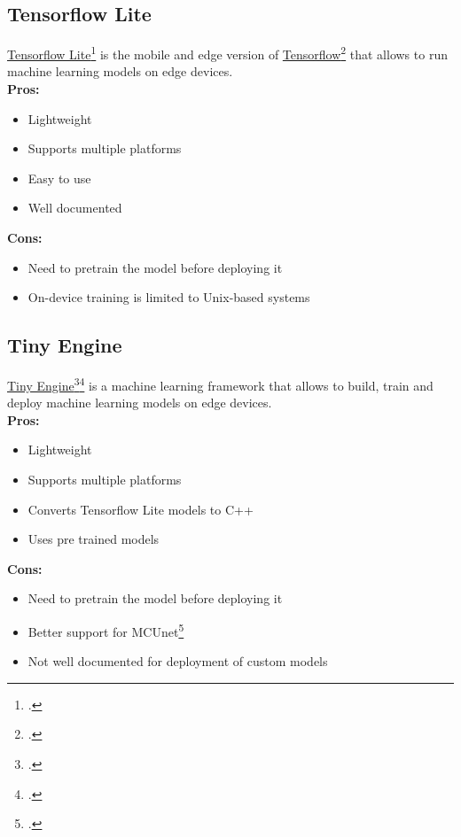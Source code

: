 \subsection{Tensorflow Lite}
\label{tensorflow-lite}
\href{https://www.tensorflow.org/lite}{Tensorflow Lite}\footcite{site:tflite} is the mobile and edge version of \href{https://www.tensorflow.org/}{Tensorflow}\footcite{site:tensorflow} that allows to run machine learning models on edge devices.\\
\textbf{Pros:}
\begin{itemize}
    \item Lightweight
    \item Supports multiple platforms
    \item Easy to use
    \item Well documented
\end{itemize}
\textbf{Cons:}
\begin{itemize}
    \item Need to pretrain the model before deploying it
    \item On-device training is limited to Unix-based systems
\end{itemize}

\subsection{Tiny Engine}
\label{tiny-engine}
\href{https://github.com/mit-han-lab/tinyengine}{Tiny Engine}\footcite{site:tinyengine}\footcite{lin2022ondevice} is a machine learning framework that allows to build, train and deploy machine learning models on edge devices.\\
\textbf{Pros:}
\begin{itemize}
    \item Lightweight
    \item Supports multiple platforms
    \item Converts Tensorflow Lite models to C++
    \item Uses pre trained models
\end{itemize}
\textbf{Cons:}
\begin{itemize}
    \item Need to pretrain the model before deploying it
    \item Better support for MCUnet\footcite{lin2020mcunet}
    \item Not well documented for deployment of custom models
\end{itemize}




